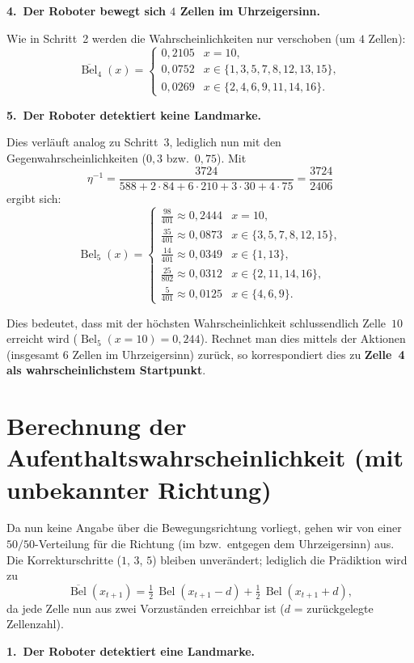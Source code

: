 \documentclass[11pt,a4paper]{article}
\newcommand{\Bel}{\operatorname{Bel}}
\newcommand{\pBel}{\overline{\operatorname{Bel}}}
\begin{document}
\textbf{4.\ Der Roboter bewegt sich $4$ Zellen im Uhrzeigersinn.}

Wie in Schritt~2 werden die Wahrscheinlichkeiten nur verschoben (um $4$ Zellen):
\[
  \pBel_4(x) =
  \begin{cases}
    0{,}2105 & x=10,\\
    0{,}0752 & x\in\{1,3,5,7,8,12,13,15\},\\
    0{,}0269 & x\in\{2,4,6,9,11,14,16\}.
  \end{cases}
\]

\textbf{5.\ Der Roboter detektiert keine Landmarke.}

Dies verläuft analog zu Schritt~3, lediglich nun mit den Gegenwahrscheinlichkeiten
($0{,}3$ bzw.\ $0{,}75$). Mit
\[
  \eta^{-1} = \frac{3724}{588 + 2\cdot 84 + 6\cdot 210 + 3\cdot 30 + 4\cdot 75} = \frac{3724}{2406}
\]
ergibt sich:
\[
  \Bel_5(x) =
  \begin{cases}
    \tfrac{98}{401}\approx 0{,}2444 & x=10,\\[0.3em]
    \tfrac{35}{401}\approx 0{,}0873 & x\in\{3,5,7,8,12,15\},\\[0.3em]
    \tfrac{14}{401}\approx 0{,}0349 & x\in\{1,13\},\\[0.3em]
    \tfrac{25}{802}\approx 0{,}0312 & x\in\{2,11,14,16\},\\[0.3em]
    \tfrac{5}{401}\approx 0{,}0125 & x\in\{4,6,9\}.
  \end{cases}
\]

Dies bedeutet, dass mit der höchsten Wahrscheinlichkeit schlussendlich Zelle~$10$ erreicht wird
($\Bel_5(x=10)=0{,}244$). Rechnet man dies mittels der Aktionen (insgesamt $6$ Zellen im
Uhrzeigersinn) zurück, so korrespondiert dies zu \textbf{Zelle~4 als wahrscheinlichstem
Startpunkt}.

\section*{Berechnung der Aufenthaltswahrscheinlichkeit (mit unbekannter Richtung)}

Da nun keine Angabe über die Bewegungsrichtung vorliegt, gehen wir von einer
$50/50$-Verteilung für die Richtung (im bzw.\ entgegen dem Uhrzeigersinn) aus. Die Korrektur\-schritte
($1$, $3$, $5$) bleiben unverändert; lediglich die Prädiktion wird zu
\[
  \pBel(x_{t+1}) = \tfrac{1}{2}\,\Bel(x_{t+1}-d) + \tfrac{1}{2}\,\Bel(x_{t+1}+d),
\]
da jede Zelle nun aus zwei Vorzuständen erreichbar ist ($d$ = zurückgelegte Zellenzahl).

\textbf{1.\ Der Roboter detektiert eine Landmarke.}
\end{document}
